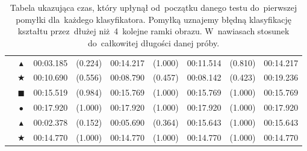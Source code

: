 \documentclass[11pt,a4paper]{article}
\begin{document}
\begin{table}[H]
\begin{tabularx}{\textwidth}{|c|c|Yr|Yr|Yr|Y|}
        & $\blacktriangle$ & 00:03.185 & \footnotesize{(0.224)} & 00:14.217 & \footnotesize{(1.000)} & 00:11.514 & \footnotesize{(0.810)} & 00:14.217 \\
        & $\bigstar$ & 00:10.690 & \footnotesize{(0.556)} & 00:08.790 & \footnotesize{(0.457)} & 00:08.142 & \footnotesize{(0.423)} & 00:19.236 \\
        \hline
        \hline
        & $\blacksquare$ & 00:15.519 & \footnotesize{(0.984)} & 00:15.769 & \footnotesize{(1.000)} & 00:15.769 & \footnotesize{(1.000)} & 00:15.769 \\
        & $\bullet$ & 00:17.920 & \footnotesize{(1.000)} & 00:17.920 & \footnotesize{(1.000)} & 00:17.920 & \footnotesize{(1.000)} & 00:17.920 \\
        & $\blacktriangle$ & 00:02.378 & \footnotesize{(0.152)} & 00:05.690 & \footnotesize{(0.364)} & 00:15.643 & \footnotesize{(1.000)} & 00:15.643 \\
        & $\bigstar$ & 00:14.770 & \footnotesize{(1.000)} & 00:14.770 & \footnotesize{(1.000)} & 00:14.770 & \footnotesize{(1.000)} & 00:14.770 \\
        \hline
    \end{tabularx}
    \caption{
        Tabela ukazująca czas, który upłynął od~początku danego testu do~pierwszej pomyłki dla~każdego klasyfikatora.
        Pomyłką uznajemy błędną klasyfikację kształtu przez~dłużej niż~4~kolejne ramki obrazu.
        W~nawiasach stosunek do~całkowitej długości danej próby.}
    \label{tab:time-trials}
\end{table}
\end{document}
